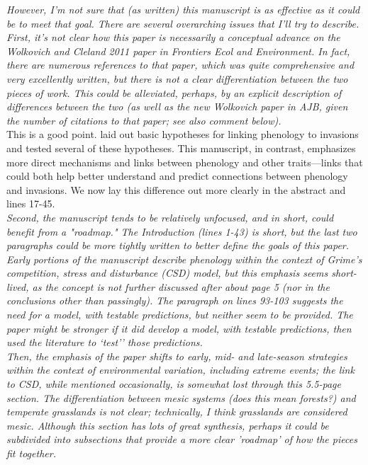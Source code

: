 \documentclass[11pt,a4paper]{letter}
\begin{document}
\begin{letter}{}
\emph{However, I'm not sure that (as written) this manuscript is as effective as it could be to meet that goal. There are several overarching issues that I'll try to describe. \\ First, it's not clear how this paper is necessarily a conceptual advance on the Wolkovich and Cleland 2011 paper in Frontiers Ecol and Environment. In fact, there are numerous references to that paper, which was quite comprehensive and very excellently written, but there is not a clear differentiation between the two pieces of work. This could be alleviated, perhaps, by an explicit description of differences between the two (as well as the new Wolkovich paper in AJB, given the number of citations to that paper; see also comment below).}\\ 

This is a good point. \cite{wolkovich:2010fee} laid out basic hypotheses for linking phenology to invasions and \cite{wolkovichAmBot2013} tested several of these hypotheses. This manuscript, in contrast, emphasizes more direct mechanisms and links between phenology and other traits---links that could both help better understand and predict connections between phenology and invasions. We now lay this difference out more clearly in the abstract and lines 17-45.
 \\

\emph{Second, the manuscript tends to be relatively unfocused, and in short, could benefit from a "roadmap." The Introduction (lines 1-43) is short, but the last two paragraphs could be more tightly written to better define the goals of this paper. Early portions of the manuscript describe phenology within the context of Grime's competition, stress and disturbance (CSD) model, but this emphasis seems short-lived, as the concept is not further discussed after about page 5 (nor in the conclusions other than passingly). The paragraph on lines 93-103 suggests the need for a model, with testable predictions, but neither seem to be provided. The paper might be stronger if it did develop a model, with testable predictions, then used the literature to `test'' those predictions.\\ Then, the emphasis of the paper shifts to early, mid- and late-season strategies within the context of environmental variation, including extreme events; the link to CSD, while mentioned occasionally, is somewhat lost through this 5.5-page section. The differentiation between mesic systems (does this mean forests?) and temperate grasslands is not clear; technically, I think grasslands are considered mesic. Although this section has lots of great synthesis, perhaps it could be subdivided into subsections that provide a more clear 'roadmap' of how the pieces fit together. } \\ 


\end{letter}
\end{document}
